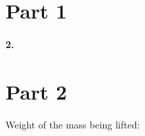 

\usepackage{enumitem}
\usepackage{graphicx}
\graphicspath{ {./lab02images/} }


\renewcommand\assignment{Lab 4: Uncertainty and Error, 2/21/2023, Partners: Maite Valentin-Lugo, Seth Waln}



    \iffalse
    \begin{equation*}
        \begin{gathered}
            Equations go here.
        \end{gathered}
    \end{equation*}

    \resizebox{\hsize}{!}{$Long equation goes here$}

    \begin{multicol*}{# of columns}
    \end{multicol*}

    \horizontal

    \fi


    \section*{Part 1}

    \paragraph*{2.}
    

    \pagebreak

    \section*{Part 2}

    Weight of the mass being lifted: 

